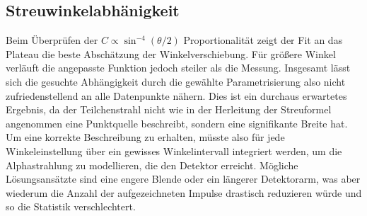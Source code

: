\subsection*{Streuwinkelabhänigkeit}

Beim Überprüfen der $C \propto \sin^{-4}(\theta / 2)$ Proportionalität zeigt der Fit an das Plateau die beste Abschätzung der Winkelverschiebung.
Für größere Winkel verläuft die angepasste Funktion jedoch steiler als die Messung. Insgesamt lässt sich die gesuchte Abhängigkeit durch die
gewählte Parametrisierung also nicht zufriedenstellend an alle Datenpunkte nähern. Dies ist ein durchaus erwartetes Ergebnis, da der
Teilchenstrahl nicht wie in der Herleitung der Streuformel angenommen eine Punktquelle beschreibt, sondern eine signifikante Breite hat. Um
eine korrekte Beschreibung zu erhalten, müsste also für jede Winkeleinstellung über ein gewisses Winkelintervall integriert werden, um die
Alphastrahlung zu modellieren, die den Detektor erreicht. Mögliche Lösungsansätzte sind eine engere Blende oder ein längerer Detektorarm, was
aber wiederum die Anzahl der aufgezeichneten Impulse drastisch reduzieren würde und so die Statistik verschlechtert.

